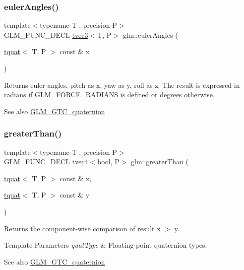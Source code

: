 \subsubsection{\texorpdfstring{euler\+Angles()}{eulerAngles()}}
{\footnotesize\ttfamily template$<$typename T , precision P$>$ \\
G\+L\+M\+\_\+\+F\+U\+N\+C\+\_\+\+D\+E\+CL \hyperlink{structglm_1_1tvec3}{tvec3}$<$T, P$>$ glm\+::euler\+Angles (\begin{DoxyParamCaption}\item[{\hyperlink{structglm_1_1tquat}{tquat}$<$ T, P $>$ const \&}]{x }\end{DoxyParamCaption})}

Returns euler angles, pitch as x, yaw as y, roll as z. The result is expressed in radians if G\+L\+M\+\_\+\+F\+O\+R\+C\+E\+\_\+\+R\+A\+D\+I\+A\+NS is defined or degrees otherwise.

\begin{DoxySeeAlso}{See also}
\hyperlink{group__gtc__quaternion}{G\+L\+M\+\_\+\+G\+T\+C\+\_\+quaternion} 
\end{DoxySeeAlso}
\mbox{\label{group__gtc__quaternion_ga09d21a588ae425ac7517ea65cc59a5ae}} 
\subsubsection{\texorpdfstring{greater\+Than()}{greaterThan()}}
{\footnotesize\ttfamily template$<$typename T , precision P$>$ \\
G\+L\+M\+\_\+\+F\+U\+N\+C\+\_\+\+D\+E\+CL \hyperlink{structglm_1_1tvec4}{tvec4}$<$bool, P$>$ glm\+::greater\+Than (\begin{DoxyParamCaption}\item[{\hyperlink{structglm_1_1tquat}{tquat}$<$ T, P $>$ const \&}]{x,  }\item[{\hyperlink{structglm_1_1tquat}{tquat}$<$ T, P $>$ const \&}]{y }\end{DoxyParamCaption})}

Returns the component-\/wise comparison of result x $>$ y.


\begin{DoxyTemplParams}{Template Parameters}
{\em quat\+Type} & Floating-\/point quaternion types.\\
\hline
\end{DoxyTemplParams}
\begin{DoxySeeAlso}{See also}
\hyperlink{group__gtc__quaternion}{G\+L\+M\+\_\+\+G\+T\+C\+\_\+quaternion} 
\end{DoxySeeAlso}
\mbox{\label{group__gtc__quaternion_ga0906a221a2037519fcf316ea5c1e3b3e}} 
